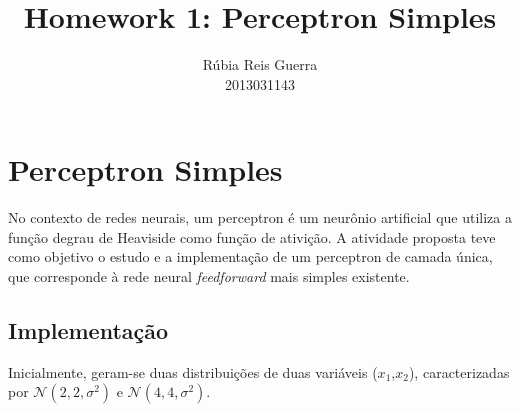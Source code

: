 \documentclass{article}
\title{Homework 1: Perceptron Simples}
\author{Rúbia Reis Guerra \\ 2013031143}
\begin{document}

\maketitle

\section{Perceptron Simples}
No contexto de redes neurais, um perceptron é um neurônio artificial que utiliza a função degrau de Heaviside como função de ativição. A atividade proposta teve como objetivo o estudo e a implementação de um perceptron de camada única, que corresponde à rede neural \textit{feedforward} mais simples existente. 


\subsection{Implementação}
Inicialmente, geram-se duas distribuições de duas variáveis ($x_{1}$,$x_{2}$), caracterizadas por $\mathcal{N}(2,2,\sigma^2)$ e $\mathcal{N}(4,4,\sigma^2)$.
\end{document}
